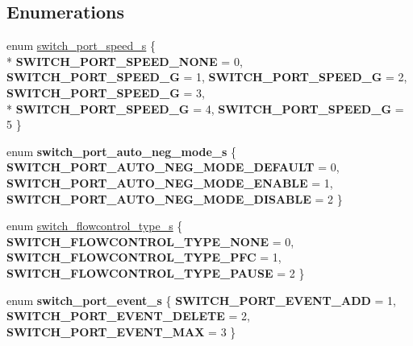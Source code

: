 \subsection*{Enumerations}
\begin{DoxyCompactItemize}
\item 
enum \hyperlink{group__Port_ga2b4ab95653b3e16a2f0ccab9982be20d}{switch\+\_\+port\+\_\+speed\+\_\+s} \{ \\*
{\bfseries S\+W\+I\+T\+C\+H\+\_\+\+P\+O\+R\+T\+\_\+\+S\+P\+E\+E\+D\+\_\+\+N\+O\+N\+E} = 0, 
{\bfseries S\+W\+I\+T\+C\+H\+\_\+\+P\+O\+R\+T\+\_\+\+S\+P\+E\+E\+D\+\_\+G} = 1, 
{\bfseries S\+W\+I\+T\+C\+H\+\_\+\+P\+O\+R\+T\+\_\+\+S\+P\+E\+E\+D\+\_\+G} = 2, 
{\bfseries S\+W\+I\+T\+C\+H\+\_\+\+P\+O\+R\+T\+\_\+\+S\+P\+E\+E\+D\+\_\+G} = 3, 
\\*
{\bfseries S\+W\+I\+T\+C\+H\+\_\+\+P\+O\+R\+T\+\_\+\+S\+P\+E\+E\+D\+\_\+G} = 4, 
{\bfseries S\+W\+I\+T\+C\+H\+\_\+\+P\+O\+R\+T\+\_\+\+S\+P\+E\+E\+D\+\_\+G} = 5
 \}
\item 
\hypertarget{group__Port_ga010215ff00cace01c6966090f6fea7e5}{enum {\bfseries switch\+\_\+port\+\_\+auto\+\_\+neg\+\_\+mode\+\_\+s} \{ {\bfseries S\+W\+I\+T\+C\+H\+\_\+\+P\+O\+R\+T\+\_\+\+A\+U\+T\+O\+\_\+\+N\+E\+G\+\_\+\+M\+O\+D\+E\+\_\+\+D\+E\+F\+A\+U\+L\+T} = 0, 
{\bfseries S\+W\+I\+T\+C\+H\+\_\+\+P\+O\+R\+T\+\_\+\+A\+U\+T\+O\+\_\+\+N\+E\+G\+\_\+\+M\+O\+D\+E\+\_\+\+E\+N\+A\+B\+L\+E} = 1, 
{\bfseries S\+W\+I\+T\+C\+H\+\_\+\+P\+O\+R\+T\+\_\+\+A\+U\+T\+O\+\_\+\+N\+E\+G\+\_\+\+M\+O\+D\+E\+\_\+\+D\+I\+S\+A\+B\+L\+E} = 2
 \}}\label{group__Port_ga010215ff00cace01c6966090f6fea7e5}

\item 
enum \hyperlink{group__Port_gad978f1f45abc92d529c0d6c1d8d75228}{switch\+\_\+flowcontrol\+\_\+type\+\_\+s} \{ {\bfseries S\+W\+I\+T\+C\+H\+\_\+\+F\+L\+O\+W\+C\+O\+N\+T\+R\+O\+L\+\_\+\+T\+Y\+P\+E\+\_\+\+N\+O\+N\+E} = 0, 
{\bfseries S\+W\+I\+T\+C\+H\+\_\+\+F\+L\+O\+W\+C\+O\+N\+T\+R\+O\+L\+\_\+\+T\+Y\+P\+E\+\_\+\+P\+F\+C} = 1, 
{\bfseries S\+W\+I\+T\+C\+H\+\_\+\+F\+L\+O\+W\+C\+O\+N\+T\+R\+O\+L\+\_\+\+T\+Y\+P\+E\+\_\+\+P\+A\+U\+S\+E} = 2
 \}
\item 
\hypertarget{group__Port_gab0f3450746e9df2487eb050a85f7d80b}{enum {\bfseries switch\+\_\+port\+\_\+event\+\_\+s} \{ {\bfseries S\+W\+I\+T\+C\+H\+\_\+\+P\+O\+R\+T\+\_\+\+E\+V\+E\+N\+T\+\_\+\+A\+D\+D} = 1, 
{\bfseries S\+W\+I\+T\+C\+H\+\_\+\+P\+O\+R\+T\+\_\+\+E\+V\+E\+N\+T\+\_\+\+D\+E\+L\+E\+T\+E} = 2, 
{\bfseries S\+W\+I\+T\+C\+H\+\_\+\+P\+O\+R\+T\+\_\+\+E\+V\+E\+N\+T\+\_\+\+M\+A\+X} = 3
 \}}\label{group__Port_gab0f3450746e9df2487eb050a85f7d80b}


\end{DoxyCompactItemize}
